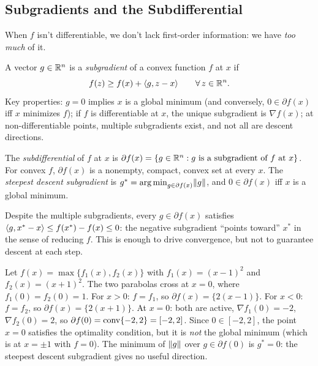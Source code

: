 \subsection{Subgradients and the Subdifferential}\label{sec:subgradients}

When $f$ isn't differentiable, we don't lack first-order information: we have \emph{too much} of it.

\begin{definition}[Subgradient]\label{def:subgradient}
	A vector $g \in \mathbb{R}^n$ is a \emph{subgradient} of a convex function $f$ at $x$ if
	\begin{equation}\label{eq:subgradient-condition}
		f(z) \geq f(x) + \langle g, z - x\rangle \qquad \forall\, z \in \mathbb{R}^n.
	\end{equation}
	Key properties: $g = 0$ implies $x$ is a global minimum (and conversely, $0 \in \partial f(x)$ iff $x$ minimizes $f$);
	if $f$ is differentiable at $x$, the unique subgradient is $\nabla f(x)$;
	at non-differentiable points, multiple subgradients exist, and not all are descent directions.
\end{definition}

\begin{definition}[Subdifferential]\label{def:subdifferential}
	The \emph{subdifferential} of $f$ at $x$ is
	$\partial f(x) = \{g \in \mathbb{R}^n : g \text{ is a subgradient of } f \text{ at } x\}$.
	For convex $f$, $\partial f(x)$ is a nonempty, compact, convex set at every $x$.
	The \emph{steepest descent subgradient} is $g^* = \operatorname*{arg\,min}_{g \in \partial f(x)} \lVert g\rVert$, and $0 \in \partial f(x)$ iff $x$ is a global minimum.
\end{definition}

Despite the multiple subgradients, every $g \in \partial f(x)$ satisfies $\langle g, x^* - x\rangle \leq f(x^*) - f(x) \leq 0$: the negative subgradient ``points toward'' $x^*$ in the sense of reducing $f$.
This is enough to drive convergence, but not to guarantee descent at each step.

\begin{example}\label{exm:subdiff-max}
	Let $f(x) = \max\{f_1(x), f_2(x)\}$ with $f_1(x) = (x-1)^2$ and $f_2(x) = (x+1)^2$.
	The two parabolas cross at $x = 0$, where $f_1(0) = f_2(0) = 1$.
	For $x > 0$: $f = f_1$, so $\partial f(x) = \{2(x-1)\}$.
	For $x < 0$: $f = f_2$, so $\partial f(x) = \{2(x+1)\}$.
	At $x = 0$: both are active, $\nabla f_1(0) = -2$, $\nabla f_2(0) = 2$, so $\partial f(0) = \operatorname{conv}\{-2, 2\} = [-2, 2]$.
	Since $0 \in [-2, 2]$, the point $x = 0$ satisfies the optimality condition, but it is \emph{not} the global minimum (which is at $x = \pm 1$ with $f = 0$).
	The minimum of $\lVert g\rVert$ over $g \in \partial f(0)$ is $g^* = 0$: the steepest descent subgradient gives no useful direction.
\end{example}

